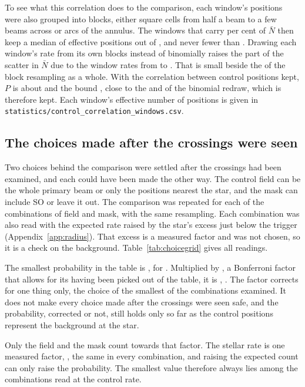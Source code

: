 To see what this correlation does to the comparison, each window's positions
were also grouped into blocks, either square cells from half a beam to a few
beams across or arcs of the annulus. The \CcNLead{} windows that carry
\CcLeadPct{} per cent of $\bar N$ then keep a median of \CcNeffLeadMed{}
effective positions out of \NCtrl, and never fewer than \CcNeffLeadMin.
Drawing each window's rate from its own blocks instead of binomially raises
the part of the scatter in $\bar N$ due to the window rates from
\CcSdBinom{} to \CcSdCorr. That is small beside the \CcSdTotal{} of the block
resampling as a whole. With the correlation between control positions kept,
$P$ is about \CcProbRange{} and the bound \CcAddLimRange, close to the \CeProbNull{}
and \CeAddLim{} of the binomial redraw, which is therefore kept.
Each window's effective number of positions is given in
\texttt{statistics/\allowbreak control\_correlation\_windows.csv}.

\subsection{The choices made after the crossings were seen}
\label{sec:choicegrid}

Two choices behind the comparison were settled after the crossings had been
examined, and each could have been made the other way. The control field
can be the whole primary beam or only the positions nearest the star, and
the mask can include SO or leave it out. The comparison was repeated for
each of the \CgNTrialWord{} combinations of field and mask, with the same
resampling. Each combination was also read with the expected rate raised by
the star's excess just below the trigger (Appendix~\ref{app:radius}). That
excess is a measured factor and was not chosen, so it is a check on the
background. Table~\ref{tab:choicegrid}
gives all \CgNCellWord{} readings.

The smallest probability in the table is \CgMinProb, for \CgMinCell.
Multiplied by \CgNTrialWord, a Bonferroni factor that allows for its having
been picked out of the table, it is \CgBonfPhrase, \CgVerdictClause.
The factor corrects for one thing only, the choice of the smallest of the
\CgNTrialWord{} combinations examined. It does not make every choice made
after the crossings were seen safe, and the probability, corrected or not,
still holds only so far as the control positions represent the background
at the star.

Only the field and the mask count towards that factor. The stellar rate
is one measured factor, \CeNear, the same in every combination, and raising
the expected count can only raise the probability. The smallest value therefore always lies among the
\CgNTrialWord{} combinations read at the control rate.

